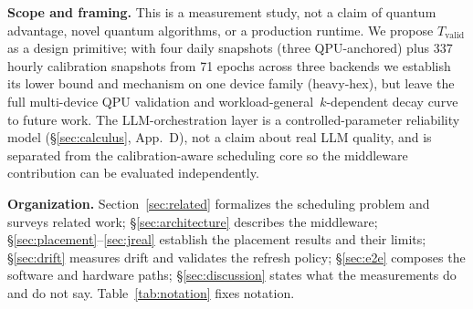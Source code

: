 \documentclass[journal,10pt,twocolumn]{IEEEtran}
\begin{document}
\noindent\textbf{Scope and framing.} This is a measurement study, not a claim of quantum advantage,
novel quantum algorithms, or a production runtime. We propose $T_{\mathrm{valid}}$ as a design primitive;
with four daily snapshots (three QPU-anchored) plus 337 hourly calibration snapshots from 71 epochs across three
backends we establish its lower bound and mechanism on one device family (heavy-hex), but leave the full
multi-device QPU validation and workload-general $\,k$-dependent decay curve to future work. The LLM-orchestration layer is a controlled-parameter reliability model
(\S\ref{sec:calculus}, App.~D), not a claim about real LLM quality, and is separated from the
calibration-aware scheduling core so the middleware contribution can be evaluated independently.

\noindent\textbf{Organization.} Section~\ref{sec:related} formalizes the scheduling problem and surveys related
work; \S\ref{sec:architecture} describes the middleware; \S\ref{sec:placement}--\ref{sec:jreal} establish the
placement results and their limits; \S\ref{sec:drift} measures drift and validates the refresh policy;
\S\ref{sec:e2e} composes the software and hardware paths; \S\ref{sec:discussion} states what the measurements do
and do not say. Table~\ref{tab:notation} fixes notation.
\end{document}
